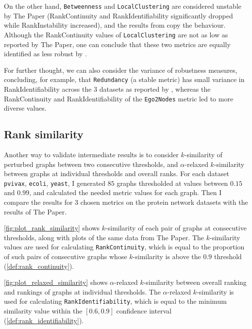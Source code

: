 On the other hand, \texttt{Betweenness} and \texttt{LocalClustering} are considered unstable by The Paper (RankContinuity and RankIdentifiability significantly dropped while RankInstability increased), and the results from \graffs copy the behaviour.
Although the RankContinuity values of \texttt{LocalClustering} are not as low as reported by The Paper, one can conclude that these two metrics are equally identified as less robust by \graffs.

For further thought, we can also consider the variance of robustness measures, concluding, for example, that \texttt{Redundancy} (a stable metric) has small variance in RankIdentifiability across the 3 datasets as reported by \graffs, whereas the RankContinuity and RankIdentifiability of the \texttt{Ego2Nodes} metric led to more diverse values.

\subsection{Rank similarity}

Another way to validate intermediate results is to consider $k$-similarity of perturbed graphs between two consecutive thresholds, and $\alpha$-relaxed $k$-similarity between graphs at individual thresholds and overall ranks.
For each dataset \texttt{pvivax}, \texttt{ecoli}, \texttt{yeast}, I generated $85$ graphs thresholded at values between $0.15$ and $0.99$, and calculated the needed metric values for each graph.
Then I compare the results for 3 chosen metrics on the protein network datasets with the results of The Paper.



\autoref{fig:plot_rank_similarity} shows $k$-similarity of each pair of graphs at consecutive thresholds, along with plots of the same data from The Paper.
The $k$-similarity values are used for calculating \texttt{RankContinuity}, which is equal to the proportion of such pairs of consecutive graphs whose $k$-similarity is above the $0.9$ threshold (\autoref{def:rank_continuity}).

\autoref{fig:plot_relaxed_similarity} shows $\alpha$-relaxed $k$-similarity between overall ranking and rankings of graphs at individual thresholds.
The $\alpha$-relaxed $k$-similarity is used for calculating \texttt{RankIdentifiability}, which is equal to the minimum similarity value within the $\left[ 0.6, 0.9 \right]$ confidence interval (\autoref{def:rank_identifiability}).

